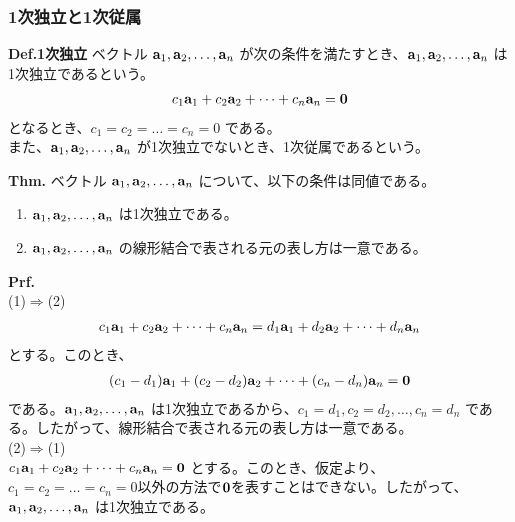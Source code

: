 \documentclass[a4paper,11pt]{jsarticle}
\numberwithin{equation}{section}
\begin{document}
\subsubsection{1次独立と1次従属}
\begin{itembox}[l]{\textbf{Def.1次独立}}
  ベクトル $\vb{a}_1, \vb{a}_2, \dots, \vb{a}_n$ が次の条件を満たすとき、$\vb{a}_1, \vb{a}_2, \dots, \vb{a}_n$ は1次独立であるという。
  \begin{align}
    c_1\vb{a}_1 + c_2\vb{a}_2 + \dots + c_n\vb{a}_n = \vb{0}
  \end{align}
  となるとき、$c_1 = c_2 = \dots = c_n = 0$ である。\\
  また、$\vb{a}_1, \vb{a}_2, \dots, \vb{a}_n$ が1次独立でないとき、1次従属であるという。
\end{itembox}

\begin{itembox}[l]{\textbf{Thm.}}
  ベクトル $\vb{a}_1, \vb{a}_2, \dots, \vb{a}_n$ について、以下の条件は同値である。
  \begin{enumerate}
    \item $\vb{a}_1, \vb{a}_2, \dots, \vb{a}_n$ は1次独立である。
    \item $\vb{a}_1, \vb{a}_2, \dots, \vb{a}_n$ の線形結合で表される元の表し方は一意である。
  \end{enumerate}
\end{itembox}
\textbf{Prf.}\\
(1)$\Rightarrow$(2)\\
\begin{align}
  c_1\vb{a}_1 + c_2\vb{a}_2 + \dots + c_n\vb{a}_n = d_1\vb{a}_1 + d_2\vb{a}_2 + \dots + d_n\vb{a}_n
\end{align}
とする。このとき、
\begin{align}
  (c_1-d_1)\vb{a}_1 + (c_2-d_2)\vb{a}_2 + \dots + (c_n-d_n)\vb{a}_n = \vb{0}
\end{align}
である。$\vb{a}_1, \vb{a}_2, \dots, \vb{a}_n$ は1次独立であるから、$c_1=d_1, c_2=d_2, \dots, c_n=d_n$ である。したがって、線形結合で表される元の表し方は一意である。\\
(2)$\Rightarrow$(1)\\
$c_1\vb{a}_1 + c_2\vb{a}_2 + \dots + c_n\vb{a}_n = \vb{0}$ とする。このとき、仮定より、$c_1=c_2=\dots=c_n=0$以外の方法で$\vb{0}$を表すことはできない。したがって、$\vb{a}_1, \vb{a}_2, \dots, \vb{a}_n$ は1次独立である。\hfill\qedsymbol\\
\end{document}
